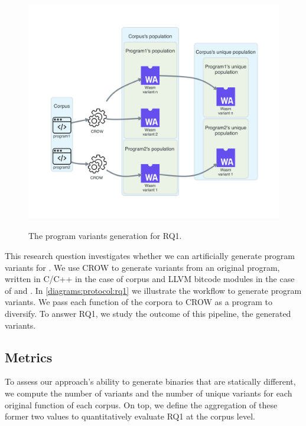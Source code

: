 
\section{\rqone}
\label{rq1:method}

\begin{figure}[h]
    \centering
    \includegraphics[height=4.1in]{diagrams/RQ1.pdf}
    \caption{The program variants generation for RQ1.}
    \label{diagrams:protocol:rq1}
\end{figure}


This research question investigates whether we can artificially generate program variants for \wasm. We use CROW to generate variants from an original program, written in C/C++ in the case of \corpusrosetta corpus and LLVM bitcode modules in the case of \corpussodium and \corpusqrcode. 
In \autoref{diagrams:protocol:rq1} we illustrate the workflow to generate \wasm program variants. We pass each function of the corpora to CROW as a program to diversify. To answer RQ1, we study the outcome of this pipeline, the generated \wasm variants. 


\subsection*{Metrics}

To assess our approach's ability to generate \wasm binaries that are statically different, we compute the number of variants and the number of unique variants for each original function of each corpus. 
On top, we define the aggregation of these former two values to quantitatively evaluate RQ1 at the corpus level. 

